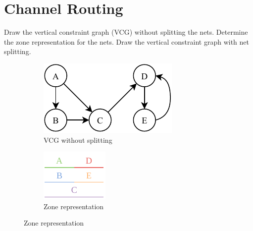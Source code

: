 \documentclass[a4paper, 10pt]{article}
\begin{document}
\section{Channel Routing}
{\color{statement} Draw the vertical constraint graph (VCG) without splitting the nets. Determine the zone representation for the nets. Draw the vertical constraint graph with net splitting.}
\begin{figure}[htbp]
    \centering
    \begin{subfigure}{0.32\textwidth}
        \centering
        \includegraphics[width=\linewidth]{2_vcg.pdf}
        \caption{VCG without splitting}
        \label{}
    \end{subfigure}
    \hfill
    \begin{subfigure}{0.22\textwidth}
        \centering
        \includegraphics[width=\linewidth]{2_zr.pdf}
        \caption{Zone representation}
        \label{}
    \end{subfigure}

\end{figure}
\end{document}

